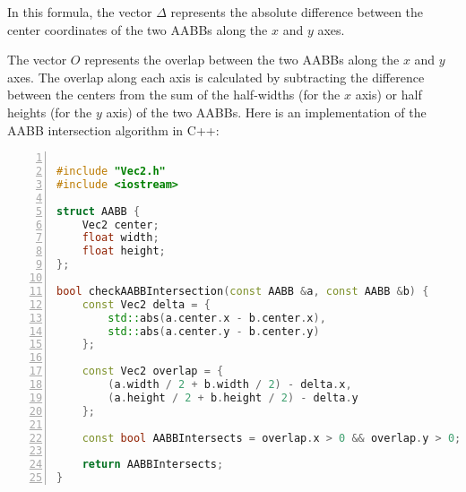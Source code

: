 \documentclass{article}
\begin{document}
In this formula, the vector $\Delta$ represents the absolute difference between
the center coordinates of the two AABBs along the $x$ and $y$ axes.

The vector $O$ represents the overlap between the two AABBs along the $x$ and
$y$ axes. The overlap along each axis is calculated by subtracting the
difference between the centers from the sum of the half-widths (for the $x$
axis) or half heights (for the $y$ axis) of the two AABBs. Here is an
implementation of the AABB intersection algorithm in C++:

\begin{mdframed}[linecolor=black!30!white,linewidth=.5pt,extratopheight=1em]
    \begin{lstlisting}[language=C++, aboveskip=3mm,
        belowskip=3mm,
        showstringspaces=false,
        columns=flexible,
        basicstyle={\small\ttfamily},
        numbers=left,
        numberstyle=\tiny\color{gray},
        keywordstyle=\color{blue},
        commentstyle=\color{dkgreen},
        stringstyle=\color{mauve},
        breaklines=true,
        breakatwhitespace=true,
        tabsize=3,
        xleftmargin=1em]

#include "Vec2.h"
#include <iostream>

struct AABB {
    Vec2 center;
    float width;
    float height;
};

bool checkAABBIntersection(const AABB &a, const AABB &b) {
    const Vec2 delta = {
        std::abs(a.center.x - b.center.x), 
        std::abs(a.center.y - b.center.y)
    };

    const Vec2 overlap = {
        (a.width / 2 + b.width / 2) - delta.x,
        (a.height / 2 + b.height / 2) - delta.y
    };
    
    const bool AABBIntersects = overlap.x > 0 && overlap.y > 0;

    return AABBIntersects;
}

\end{lstlisting}
\end{mdframed}

\end{document}
